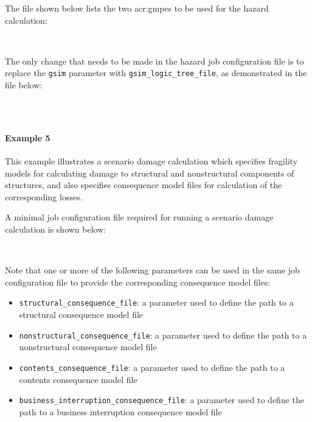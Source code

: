 The file shown below lists the two \glspl{acr:gmpe} to be used for the hazard
calculation:

\inputminted[firstline=1,firstnumber=1,fontsize=\footnotesize,frame=single,linenos,bgcolor=lightgray,label=gsim\_logic\_tree.xml]{xml}{oqum/risk/verbatim/input_scenario_gmlt.xml}\\

The only change that needs to be made in the hazard job configuration file is
to replace the \Verb+gsim+ parameter with \Verb+gsim_logic_tree_file+, as
demonstrated in the file below:

\inputminted[firstline=1,firstnumber=1,fontsize=\footnotesize,frame=single,linenos,bgcolor=lightgray,label=job\_hazard.ini]{ini}{oqum/risk/verbatim/config_scenario_hazard_gmlt.ini}\\


\paragraph{Example 5}

This example illustrates a scenario damage calculation which specifies
fragility models for calculating damage to structural and nonstructural
components of structures, and also specifies consequence model files for
calculation of the corresponding losses.

A minimal job configuration file required for
running a scenario damage calculation is shown below:

\inputminted[firstline=1,firstnumber=1,fontsize=\footnotesize,frame=single,linenos,bgcolor=lightgray,label=job.ini]{ini}{oqum/risk/verbatim/config_scenario_damage_consequences.ini}\\

Note that one or more of the following parameters can be used in the same job
configuration file to provide the corresponding consequence model files:

\begin{itemize}

  \item \Verb+structural_consequence_file+: a parameter used to define the path
    to a structural \gls{consequence model} file

  \item \Verb+nonstructural_consequence_file+: a parameter used to define the path
    to a nonstructural \gls{consequence model} file

  \item \Verb+contents_consequence_file+: a parameter used to define the path
    to a contents \gls{consequence model} file

  \item \Verb+business_interruption_consequence_file+: a parameter used to define
    the path to a business interruption \gls{consequence model} file

\end{itemize}

